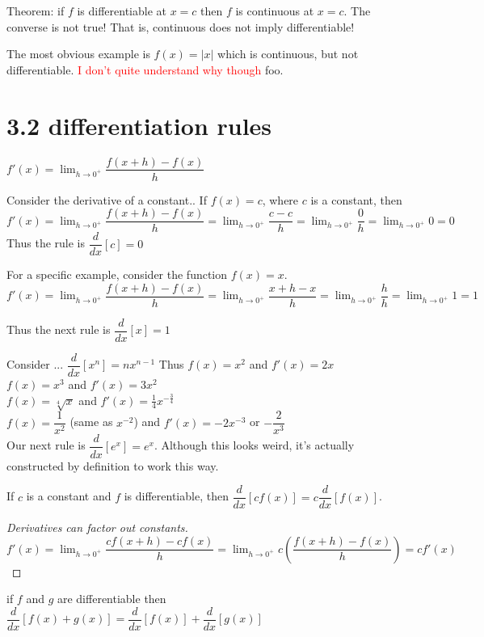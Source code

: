 \documentclass[12pt]{article}
\begin{document}
Theorem: if $f$ is differentiable at $x=c$ then $f$ is continuous at $x=c$. The converse is not true! That
is, continuous does not imply differentiable!

The most obvious example is $f(x) = |x|$ which is continuous, but not differentiable. 
\textcolor{red}{I don't quite understand why though } foo.
\section{3.2 differentiation rules}
$f'(x) = \lim_{h\to0^{+}}\dfrac{f(x+h)-f(x)}{h}$

Consider the derivative of a constant..
If $f(x)=c$, where $c$ is a constant, then $f'(x) = \lim_{h\to0^{+}}\dfrac{f(x+h)-f(x)}{h} =
\lim_{h\to0^{+}}\dfrac{c-c}{h}=\lim_{h\to0^{+}}\dfrac{0}{h}=\lim_{h\to0^{+}}0=0$
Thus the rule is $\dfrac{d}{dx} \left[ c \right] = 0$

For a specific example, consider the function $f(x)=x$.
 $f'(x) = \lim_{h\to0^{+}}\dfrac{f(x+h)-f(x)}{h} =
\lim_{h\to0^{+}}\dfrac{x+h-x}{h}=\lim_{h\to0^{+}}\dfrac{h}{h}=\lim_{h\to0^{+}}1=1$

Thus the next rule is  $\dfrac{d}{dx} \left[ x \right] = 1$

Consider  ...  $\dfrac{d}{dx} \left[ x^{n} \right] = nx^{n-1}$
Thus $f(x)=x^{2}$ and $f'(x)=2x$\\
$f(x)=x^{3}$ and $f'(x)=3x^{2}$\\
$f(x)=\sqrt[4]{x}$ and $f'(x)=\frac{1}{4}x^{-\frac{3}{4}}$\\
$f(x)=\dfrac{1}{x^{2}}$ (same as $x^{-2}$) and $f'(x)=-2x^{-3}$ or $-\dfrac{2}{x^{3}}$\\

Our next rule is   $\dfrac{d}{dx} \left[ e^{x} \right] = e^{x}$. Although this looks weird, it's actually
constructed by definition to work this way.

If $c$ is a constant and $f$ is differentiable, then $\dfrac{d}{dx} \left[ cf(x) \right] = c\dfrac{d}{dx} \left[ f(x) \right]$.

\begin{proof}[Derivatives can factor out constants]
  $f'(x) = \lim_{h\to0^{+}}\dfrac{cf(x+h)-cf(x)}{h} = \lim_{h\to0^{+}}c \left(\dfrac{f(x+h)-f(x)}{h} \right) = cf'(x)$
\end{proof}

if $f$ and $g$ are differentiable then $\dfrac{d}{dx} \left[ f(x)+g(x) \right] =  \dfrac{d}{dx} \left[ f(x)
\right] + \dfrac{d}{dx} \left[ g(x) \right]$
\end{document}
